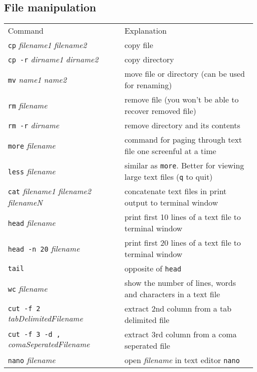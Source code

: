\subsection{File manipulation}
\begin{tabular}{ll}
  Command & Explanation \\
  \hhline{==}
  \texttt{cp} \textit{filename1} \textit{filename2} & copy file \\
  \texttt{cp -r} \textit{dirname1} \textit{dirname2} & copy directory \\
  \texttt{mv} \textit{name1} \textit{name2} & move file or directory (can be used for renaming) \\
  \texttt{rm} \textit{filename} & remove file (you won't be able to recover removed file) \\
  \texttt{rm -r} \textit{dirname} & remove directory and its contents \\
  \texttt{more} \textit{filename} & command for paging through text file one screenful at a time \\%
  \texttt{less} \textit{filename} & similar as \texttt{more}. Better for viewing large text files (\texttt{q} to quit) \\
  \texttt{cat} \textit{filename1 filename2 filenameN} & concatenate text files in print output to terminal window \\
  \texttt{head} \textit{filename} & print first 10 lines of a text file to terminal window \\
  \texttt{head -n 20} \textit{filename} &  print first 20 lines of a text file to terminal window \\
  \texttt{tail} & opposite of \texttt{head} \\
  \texttt{wc} \textit{filename} & show the number of lines, words and characters in a text file \\
  \texttt{cut -f 2} \textit{tabDelimitedFilename} & extract 2nd column from a tab delimited file \\
  \texttt{cut -f 3 -d ,} \textit{comaSeperatedFilename} & extract 3rd column from a coma seperated file \\
  \texttt{nano} \textit{filename} & open \textit{filename} in text editor \texttt{nano} \\
\end{tabular}

